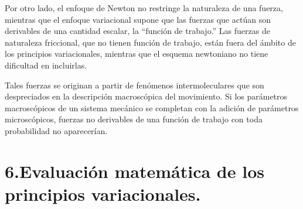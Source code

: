 Por otro lado, el enfoque de Newton no restringe la naturaleza de una fuerza, mientras que el enfoque variacional supone que las fuerzas que actúan son derivables de una cantidad escalar, la ``función de trabajo.'' Las fuerzas de naturaleza friccional, que no tienen función de trabajo, están fuera del ámbito de los principios variacionales, mientras que el esquema newtoniano no tiene dificultad en incluirlas.

\begin{small}
\noindent Tales fuerzas se originan a partir de fenómenos intermoleculares que son despreciados en la descripción macroscópica del movimiento. Si los parámetros macroscópicos de un sistema mecánico se completan con la adición de parámetros microscópicos, fuerzas no derivables de una función de trabajo con toda probabilidad no aparecerían.
\end{small}

\section*{6.\quad Evaluación matemática de los principios variacionales.}

